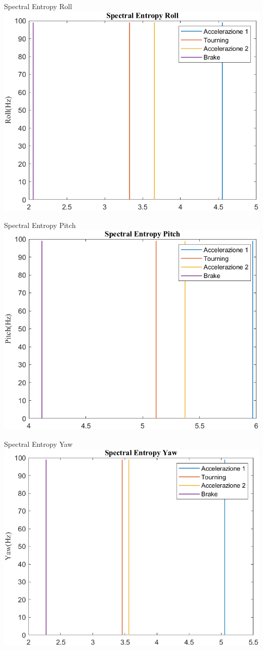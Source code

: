 \documentclass[beamer]{standalone}
\begin{document}
	\begin{frame}{{Spectral Entropy Roll}}
		\centering\includegraphics[height=.8\textheight]{figure/VAng/Trasformata/Spectral EntropyRoll}
	\end{frame}
	
	\begin{frame}{{Spectral Entropy Pitch}}
		\centering\includegraphics[height=.8\textheight]{figure/VAng/Trasformata/Spectral EntropyPitch}
	\end{frame}
	
	\begin{frame}{{Spectral Entropy Yaw}}
		\centering\includegraphics[height=.8\textheight]{figure/VAng/Trasformata/Spectral EntropyYaw}
	\end{frame}
	
\end{document}
